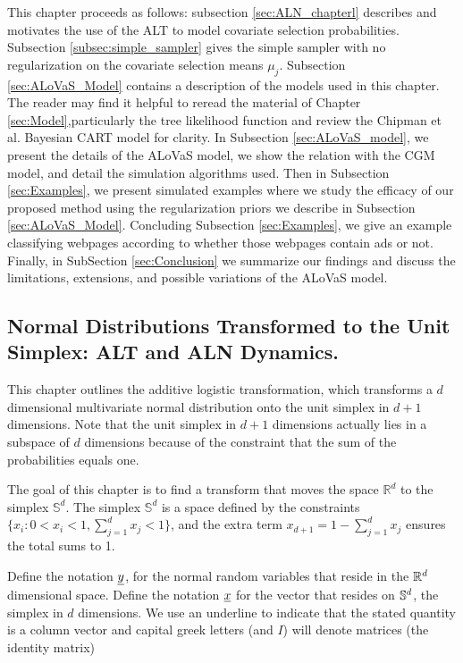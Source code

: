 This chapter proceeds as follows: subsection \ref{sec:ALN_chapterl} describes and motivates the use of the ALT to model covariate selection probabilities. Subsection \ref{subsec:simple_sampler} gives the simple sampler with no regularization on the covariate selection means $\mu_j$. Subsection \ref{sec:ALoVaS_Model} contains a description of the models used in this chapter. The reader may find it helpful to reread the material of Chapter \ref{sec:Model},particularly the tree likelihood function and review the Chipman et al. Bayesian CART \cite{chipman1998bayesian} model for clarity. In Subsection \ref{sec:ALoVaS_model}, we present the details of the ALoVaS model, we show the relation with the CGM model, and detail the simulation algorithms used. Then in Subsection \ref{sec:Examples}, we present simulated examples where we study the efficacy of our proposed method using the regularization priors we describe in Subsection \ref{sec:ALoVaS_Model}. Concluding Subsection \ref{sec:Examples}, we give an example classifying webpages according to whether those webpages contain ads or not. Finally, in SubSection \ref{sec:Conclusion} we summarize our findings and discuss the limitations, extensions, and possible variations of the ALoVaS model.      


\subsection{Normal Distributions Transformed to the Unit Simplex: ALT and ALN Dynamics. }\label{sec:ALN_chapter}

This chapter outlines the additive logistic transformation, which transforms a $d$ dimensional multivariate normal distribution onto the unit simplex in $d+1$ dimensions. Note that the unit simplex in $d+1$ dimensions actually lies in a subspace of $d$ dimensions because of the constraint that the sum of the probabilities equals one. 

The goal of this chapter is to find a transform that moves the space $\mathbb{R}^d$  to the simplex $\mathbb{S}^d$.  The simplex $\mathbb{S}^d$ is a space defined by the constraints $\{x_i: 0<x_i<1, \sum_{j=1}^dx_j <1 \}$, and the extra term $x_{d+1}=1-\sum_{j=1}^d x_j$ ensures the total sums to 1.  

Define the notation $\underline{y}$, for the normal random variables that reside in the $\mathbb{R}^{d}$  dimensional space. Define the notation $\underline{x}$  for the vector that resides on $\mathbb{S}^{d}$, the simplex in $d$ dimensions. We use an underline to indicate that the stated quantity is a column vector and capital greek letters (and $I$) will denote matrices (the identity matrix) 

